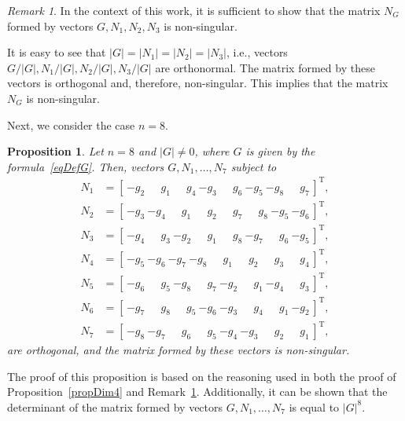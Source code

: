 \documentclass[10pt,reqno]{amsart}
\newcommand{\trans}{{\scriptscriptstyle \mathrm{T}}}
\theoremstyle{plain}
\newtheorem{Proposition}{Proposition}
\theoremstyle{remark}
\newtheorem{Remark}{Remark}
\begin{document}
\begin{Remark}\label{rem5}
In the context of this work, it is sufficient to show that the matrix $N_G$ formed by vectors $G,N_1,N_2,N_3$ is non-singular.

It is easy to see that $|G| = |N_1| = |N_2| = |N_3|$, i.e., vectors $G/|G|,N_1/|G|,N_2/|G|,N_3/|G|$ are orthonormal. The matrix formed by these vectors is orthogonal and, therefore, non-singular. This implies that the matrix $N_G$ is non-singular.
\end{Remark}

Next, we consider the case $n = 8$.

\begin{Proposition}\label{propDim8}
Let $n = 8$ and $|G| \neq 0$, where $G$ is given by the formula~\eqref{eqDefG}. Then, vectors $G,N_1,\dots,N_7$ subject to
\begin{equation}\label{eqBasisDim8}
  \begin{aligned}
    N_1 & = [ \, {-g_2} ~ \phantom{-}g_1 ~ \phantom{-}g_4 ~ {-g_3} ~ \phantom{-}g_6 ~ {-g_5} ~ {-g_8} ~ \phantom{-}g_7 \, ]^\trans, \\
    N_2 & = [ \, {-g_3} ~ {-g_4} ~ \phantom{-}g_1 ~ \phantom{-}g_2 ~ \phantom{-}g_7 ~ \phantom{-}g_8 ~ {-g_5} ~ {-g_6} \, ]^\trans, \\
    N_3 & = [ \, {-g_4} ~ \phantom{-}g_3 ~ {-g_2} ~ \phantom{-}g_1 ~ \phantom{-}g_8 ~ {-g_7} ~ \phantom{-}g_6 ~ {-g_5} \, ]^\trans, \\
    N_4 & = [ \, {-g_5} ~ {-g_6} ~ {-g_7} ~ {-g_8} ~ \phantom{-}g_1 ~ \phantom{-}g_2 ~ \phantom{-}g_3 ~ \phantom{-}g_4 \, ]^\trans, \\
    N_5 & = [ \, {-g_6} ~ \phantom{-}g_5 ~ {-g_8} ~ \phantom{-}g_7 ~ {-g_2} ~ \phantom{-}g_1 ~ {-g_4} ~ \phantom{-}g_3 \, ]^\trans, \\
    N_6 & = [ \, {-g_7} ~ \phantom{-}g_8 ~ \phantom{-}g_5 ~ {-g_6} ~ {-g_3} ~ \phantom{-}g_4 ~ \phantom{-}g_1 ~ {-g_2} \, ]^\trans, \\
    N_7 & = [ \, {-g_8} ~ {-g_7} ~ \phantom{-}g_6 ~ \phantom{-}g_5 ~ {-g_4} ~ {-g_3} ~ \phantom{-}g_2 ~ \phantom{-}g_1 \, ]^\trans,
  \end{aligned}
\end{equation}
are orthogonal, and the matrix formed by these vectors is non-singular.
\end{Proposition}

The proof of this proposition is based on the reasoning used in both the proof of Proposition~\ref{propDim4} and Remark~\ref{rem5}. Additionally, it can be shown that the determinant of the matrix formed by vectors $G,N_1,\dots,N_7$ is equal to $|G|^8$.
\end{document}
